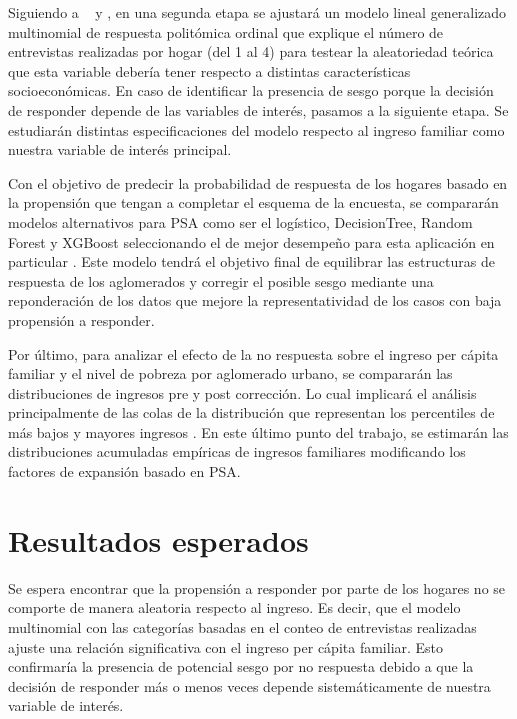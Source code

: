 \documentclass{article}
\begin{document}
Siguiendo a ~ \cite{korinek07} y \cite{handbook}, en una segunda etapa se ajustará un modelo lineal generalizado multinomial de respuesta politómica ordinal que explique el número de entrevistas realizadas por hogar (del 1 al 4) para testear la aleatoriedad teórica que esta variable debería tener respecto a distintas características socioeconómicas. En caso de identificar la presencia de sesgo porque la decisión de responder depende de las variables de interés, pasamos a la siguiente etapa. Se estudiarán distintas especificaciones del modelo respecto al ingreso familiar como nuestra variable de interés principal.

Con el objetivo de predecir la probabilidad de respuesta de los hogares basado en la propensión que tengan a completar el esquema de la encuesta, se compararán modelos alternativos para PSA como ser el logístico, DecisionTree, Random Forest y XGBoost seleccionando el de mejor desempeño para esta aplicación en particular \cite{methodsml}. Este modelo tendrá el objetivo final de equilibrar las estructuras de respuesta de los aglomerados y corregir el posible sesgo mediante una reponderación de los datos que mejore la representatividad de los casos con baja propensión a responder. 

Por último, para analizar el efecto de la no respuesta sobre el ingreso per cápita familiar y el nivel de pobreza por aglomerado urbano, se compararán las distribuciones de ingresos pre y post corrección. Lo cual implicará el análisis principalmente de las colas de la distribución que representan los percentiles de más bajos y mayores ingresos \cite{korinek07}. En este último punto del trabajo, se estimarán las distribuciones acumuladas empíricas de ingresos familiares modificando los factores de expansión basado en PSA.

\section{Resultados esperados}

Se espera encontrar que la propensión a responder por parte de los hogares no se comporte de manera aleatoria respecto al ingreso. Es decir, que el modelo multinomial con las categorías basadas en el conteo de entrevistas realizadas ajuste una relación significativa con el ingreso per cápita familiar. Esto confirmaría la presencia de potencial sesgo por no respuesta debido a que la decisión de responder más o menos veces depende sistemáticamente de nuestra variable de interés. 
\end{document}
